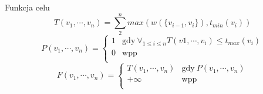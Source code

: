 \begin{block}{Funkcja celu}
	\begin{equation}
		T(v_1, \cdots, v_n) = \sum\limits_2^n max(w(\{v_{i-1}, v_i\}), t_{min}(v_i))
	\end{equation}
	\begin{equation}
		P(v_1, \cdots, v_n) = \begin{cases}
			1 & \text{gdy} \ \forall_{1 \leq i \leq n} T(v1, \cdots, v_i) \leq t_{max}(v_i) \\
			0 & \text{wpp} \\
		\end{cases}
	\end{equation}
	\begin{equation}
		F(v_1, \cdots, v_n) = \begin{cases}
			T(v_1, \cdots, v_n)	& \text{gdy} \ P(v_1, \cdots, v_n) \\
			+\infty 		& \text{wpp} \\
		\end{cases}
	\end{equation}
\end{block}
